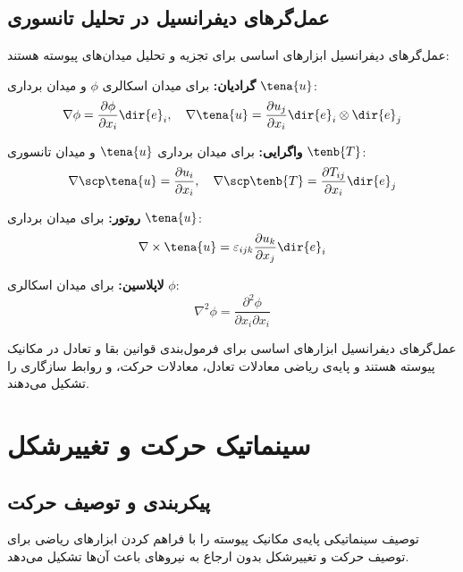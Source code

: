 \subsection{عمل‌گرهای دیفرانسیل در تحلیل تانسوری}

عمل‌گرهای دیفرانسیل ابزارهای اساسی برای تجزیه و تحلیل میدان‌های پیوسته هستند:

\textbf{گرادیان:} برای میدان اسکالری $\phi$ و میدان برداری $\tena{u}$:
\begin{equation}
	\nabla \phi = \frac{\partial \phi}{\partial x_i} \dir{e}_i, \quad \nabla \tena{u} = \frac{\partial u_j}{\partial x_i} \dir{e}_i \otimes \dir{e}_j
\end{equation}

\textbf{واگرایی:} برای میدان برداری $\tena{u}$ و میدان تانسوری $\tenb{T}$:
\begin{equation}
	\nabla \scp \tena{u} = \frac{\partial u_i}{\partial x_i}, \quad \nabla \scp \tenb{T} = \frac{\partial T_{ij}}{\partial x_i} \dir{e}_j
\end{equation}

\textbf{روتور:} برای میدان برداری $\tena{u}$:
\begin{equation}
	\nabla \times \tena{u} = \varepsilon_{ijk} \frac{\partial u_k}{\partial x_j} \dir{e}_i
\end{equation}

\textbf{لاپلاسین:} برای میدان اسکالری $\phi$:
\begin{equation}
	\nabla^2 \phi = \frac{\partial^2 \phi}{\partial x_i \partial x_i}
\end{equation}

\begin{keypoint}
	عمل‌گرهای دیفرانسیل ابزارهای اساسی برای فرمول‌بندی قوانین بقا و تعادل در مکانیک پیوسته هستند و پایه‌ی ریاضی معادلات تعادل، معادلات حرکت، و روابط سازگاری را تشکیل می‌دهند.
\end{keypoint}

\section{سینماتیک حرکت و تغییرشکل}

\subsection{پیکربندی و توصیف حرکت}

توصیف سینماتیکی پایه‌ی مکانیک پیوسته را با فراهم کردن ابزارهای ریاضی برای توصیف حرکت و تغییرشکل بدون ارجاع به نیروهای باعث آن‌ها تشکیل می‌دهد.


